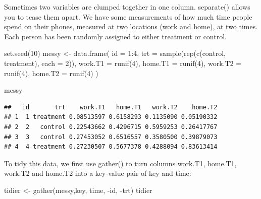 \documentclass[
]{book}
\newenvironment{Shaded}{\begin{snugshade}}{\end{snugshade}}
\newcommand{\AttributeTok}[1]{\textcolor[rgb]{0.77,0.63,0.00}{#1}}
\newcommand{\DecValTok}[1]{\textcolor[rgb]{0.00,0.00,0.81}{#1}}
\newcommand{\FunctionTok}[1]{\textcolor[rgb]{0.00,0.00,0.00}{#1}}
\newcommand{\NormalTok}[1]{#1}
\newcommand{\OtherTok}[1]{\textcolor[rgb]{0.56,0.35,0.01}{#1}}
\newcommand{\SpecialCharTok}[1]{\textcolor[rgb]{0.00,0.00,0.00}{#1}}
\newcommand{\StringTok}[1]{\textcolor[rgb]{0.31,0.60,0.02}{#1}}
\begin{document}
Sometimes two variables are clumped together in one column. separate() allows you to tease them apart. We have some measurements of how much time people spend on their phones, measured at two locations (work and home), at two times. Each person has been randomly assigned to either treatment or control.

\begin{Shaded}
\begin{Highlighting}[]
\FunctionTok{set.seed}\NormalTok{(}\DecValTok{10}\NormalTok{)}
\NormalTok{messy }\OtherTok{\textless{}{-}} \FunctionTok{data.frame}\NormalTok{(}
  \AttributeTok{id =} \DecValTok{1}\SpecialCharTok{:}\DecValTok{4}\NormalTok{,}
  \AttributeTok{trt =} \FunctionTok{sample}\NormalTok{(}\FunctionTok{rep}\NormalTok{(}\FunctionTok{c}\NormalTok{(}\StringTok{\textquotesingle{}control\textquotesingle{}}\NormalTok{, }\StringTok{\textquotesingle{}treatment\textquotesingle{}}\NormalTok{), }\AttributeTok{each =} \DecValTok{2}\NormalTok{)),}
  \AttributeTok{work.T1 =} \FunctionTok{runif}\NormalTok{(}\DecValTok{4}\NormalTok{),}
  \AttributeTok{home.T1 =} \FunctionTok{runif}\NormalTok{(}\DecValTok{4}\NormalTok{),}
  \AttributeTok{work.T2 =} \FunctionTok{runif}\NormalTok{(}\DecValTok{4}\NormalTok{),}
  \AttributeTok{home.T2 =} \FunctionTok{runif}\NormalTok{(}\DecValTok{4}\NormalTok{)}
\NormalTok{)}
\end{Highlighting}
\end{Shaded}

\begin{Shaded}
\begin{Highlighting}[]
\NormalTok{messy}
\end{Highlighting}
\end{Shaded}

\begin{verbatim}
##   id       trt    work.T1   home.T1   work.T2    home.T2
## 1  1 treatment 0.08513597 0.6158293 0.1135090 0.05190332
## 2  2   control 0.22543662 0.4296715 0.5959253 0.26417767
## 3  3   control 0.27453052 0.6516557 0.3580500 0.39879073
## 4  4 treatment 0.27230507 0.5677378 0.4288094 0.83613414
\end{verbatim}

To tidy this data, we first use gather() to turn columns work.T1, home.T1, work.T2 and home.T2 into a key-value pair of key and time:

\begin{Shaded}
\begin{Highlighting}[]
\NormalTok{tidier }\OtherTok{\textless{}{-}}  \FunctionTok{gather}\NormalTok{(messy,key, time, }\SpecialCharTok{{-}}\NormalTok{id, }\SpecialCharTok{{-}}\NormalTok{trt)}
\NormalTok{tidier}
\end{Highlighting}
\end{Shaded}
\end{document}
